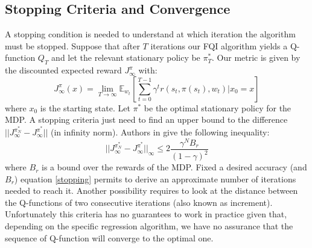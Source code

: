 	\subsection{Stopping Criteria and Convergence}

	\noindent A stopping condition is needed to understand at which iteration the algorithm must be stopped.
	Suppose that after $T$ iterations our FQI algorithm yields a Q-function $Q_T$ and let the relevant stationary
	policy be $\pi^*_T$. Our metric is given by the discounted expected reward $J_{\infty}^{\pi}$ with:
	\begin{equation}
		J_{\infty}^{\pi}(x) = \lim_{T \rightarrow \infty} \mathbb{E}_{w_t} \left [ \sum_{t=0}^{T-1} \gamma^{t} r(s_t, \pi(s_t), w_t) | x_0 = x  \right ]
	\end{equation}
	\noindent where $x_0$ is the starting state.\newline
	Let $\pi^*$ be the optimal stationary policy for the MDP. A stopping criteria just need to find an upper bound
	to the difference $||J_{\infty}^{\pi_{N}^{*}} - J_{\infty}^{\pi^{*}}||$ (in infinity norm). Authors in \cite{ernst2005tree} give the following
	inequality:
	\begin{equation}
		||J_{\infty}^{\pi_{N}^{*}} - J_{\infty}^{\pi^{*}}||_{\infty} \leq 2 \frac{\gamma^{N}B_r}{(1-\gamma)^2}
		\label{stopping}
	\end{equation}
	\noindent where $B_r$ is a bound over the rewards of the MDP. Fixed a desired accuracy (and $B_r$) equation \ref{stopping}
	permits to derive an approximate number of iterations needed to reach it.\newline
	Another possibility requires to look at the distance between the Q-functions of two consecutive iterations (also known as
	increment). Unfortunately this criteria has no guarantees to work in practice given that, depending on the specific
	regression algorithm, we have no assurance that the sequence of Q-function will converge to the optimal one.\newline

